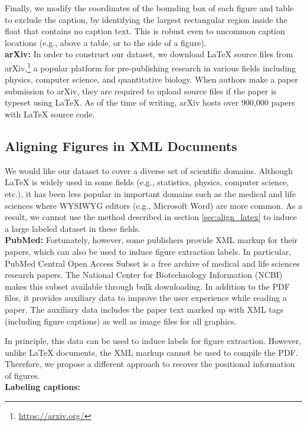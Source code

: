 \documentclass[sigconf]{acmart}
\begin{document}
Finally, we modify the coordinates of the bounding box of each figure and table to exclude the caption, by identifying the largest rectangular region inside the float that contains no caption text.
This is robust even to uncommon caption locations (e.g., above a table, or to the side of a figure).
\\[15pt]\textbf{arXiv:}%
In order to construct our dataset, we download LaTeX source files from arXiv,\footnote{\url{https://arxiv.org/}} a popular platform for pre-publishing research in various fields including physics, computer science, and quantitative biology.
When authors make a paper submission to arXiv, they are required to upload source files if the paper is typeset using LaTeX.
As of the time of writing, arXiv hosts over 900,000 papers with LaTeX source code. 

\subsection{Aligning Figures in XML Documents}%
We would like our dataset to cover a diverse set of scientific domains.
Although LaTeX is widely used in some fields (e.g., statistics, physics, computer science, etc.), it has been less popular in important domains such as the medical and life sciences where WYSIWYG editors (e.g., Microsoft Word) are more common. 
As a result, we cannot use the method described in section \ref{sec:align_latex} to induce a large labeled dataset in these fields.
\\[15pt]\textbf{PubMed:}%
Fortunately, however, some publishers provide XML markup for their papers, which can also be used to induce figure extraction labels. 
In particular, PubMed Central Open Access Subset is a free archive of medical and life sciences research papers. 
The National Center for Biotechnology Information (NCBI) makes this subset available through bulk downloading.
In addition to the PDF files, it provides auxiliary data to improve the user experience while reading a paper. 
The auxiliary data includes the paper text marked up with XML tags (including figure captions) as well as image files for all graphics. 

In principle, this data can be used to induce labels for figure extraction.
However, unlike LaTeX documents, the XML markup cannot be used to compile the PDF.
Therefore, we propose a different approach to recover the positional information of figures.
\\[15pt]\textbf{Labeling captions:}
\end{document}

